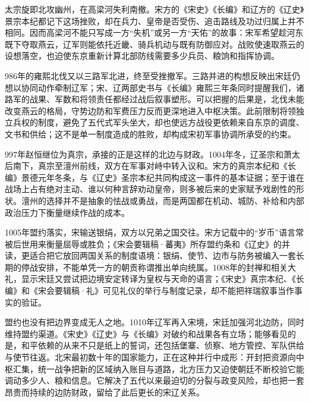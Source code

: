 太宗旋即北攻幽州，在高梁河失利南撤。宋方的《宋史》《长编》和辽方的《辽史》景宗本纪都记下这场挫败，却在兵力、皇帝是否受伤、追击路线及功过归属上并不相同。因而高梁河不能只写成一方“失机”或另一方“天佑”的故事：宋军希望趁河东既下夺取燕云，辽军则能依托近畿、骑兵机动与既有防御应对。战败使速取燕云的设想落空，也迫使东京重新计算北部防线需要多少兵员、粮饷和指挥协调。

986年的雍熙北伐又以三路军北进，终至受挫撤军。三路并进的构想反映出宋廷仍想以协同动作牵制辽军；宋、辽两部史书与《长编》雍熙三年条同时提醒我们，诸路军的战果、军数和将领责任都经过战后叙事塑形。可以把握的后果是，北伐未能改变燕云的格局，守势边防和军费压力反而更深地进入中枢决策。此前限制将领独立兵权的制度，避免了五代式军头坐大，却也使远方战役更依赖来自东京的调度、文书和供给；这不是单一制度造成的胜败，却构成宋初军事协调所承受的约束。

997年赵恒继位为真宗，承接的正是这样的北边与财政。1004年冬，辽圣宗和萧太后南下，真宗至澶州前线，双方在军事对峙中转入议和。宋方的真宗本纪和《长编》景德元年冬条，与《辽史》圣宗本纪共同构成这一事件的基本证据；至于谁在战场上占有绝对主动、谁以何种言辞劝动皇帝，则多被后来的史家赋予戏剧性的形状。澶州的选择并不是抽象的怯战或勇战，而是两国都在机动、城防、补给和内部政治压力下衡量继续作战的成本。

1005年盟约落实，宋输送银绢，双方以兄弟之国交往。宋方记载中的“岁币”语言常被后世用来衡量屈辱或胜负；《宋会要辑稿·蕃夷》所存盟约条和《辽史》的并读，更适合把它放回两国关系的制度语境：银绢、使节、边市与防务被编入一套长期的停战安排，不能单凭一方的朝贡称谓推出单向统属。1008年的封禅和相关大礼，显示宋廷又尝试把边境安定转译为皇权与天命的语言；《宋史》真宗本纪、《长编》和《宋会要辑稿·礼》可见礼仪的举行与制度记录，却不能把祥瑞叙事当作事实的验证。



盟约也没有把边界变成无人之地。1010年辽军再入宋境，宋廷加强河北边防，同时维持盟约渠道。《宋史》《辽史》与《长编》对破约和战果各有立场；能够看见的是，和平依赖的从来不只是纸上的誓词，还包括堡寨、侦察、地方管控、军队供给与使节往返。北宋最初数十年的国家能力，正在这种并行中成形：开封把资源向中枢汇集，统一战争把新的区域纳入账目与道路，北方压力又迫使朝廷不断校验它能调动多少人、粮和信息。它解决了五代以来最迫切的分裂与政变风险，却也把一套昂贵而持续的边防财政，留给了此后更长的宋辽关系。
